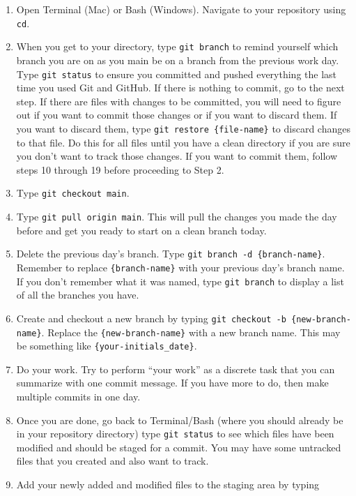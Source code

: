 \documentclass[
]{book}
\providecommand{\tightlist}{%
  \setlength{\itemsep}{0pt}\setlength{\parskip}{0pt}}
\begin{document}
\begin{enumerate}
\def\labelenumi{\arabic{enumi}.}
\tightlist
\item
  Open Terminal (Mac) or Bash (Windows). Navigate to your repository using \texttt{cd}.
\item
  When you get to your directory, type \texttt{git\ branch} to remind yourself
  which branch you are on as you main be on a branch from the previous work day.
  Type \texttt{git\ status} to ensure you committed and pushed everything the last time
  you used Git and GitHub. If there is nothing to commit, go to the next step.
  If there are files with changes to be committed, you will need to figure out if
  you want to commit those changes or if you want to discard them. If you want to
  discard them, type \texttt{git\ restore\ \{file-name\}} to discard changes to that file. Do
  this for all files until you have a clean directory if you are sure you don't
  want to track those changes. If you want to commit them, follow steps 10 through 19
  before proceeding to Step 2.
\item
  Type \texttt{git\ checkout\ main}.
\item
  Type \texttt{git\ pull\ origin\ main}. This will pull the changes you made
  the day before and get you ready to start on a clean branch today.
\item
  Delete the previous day's branch. Type \texttt{git\ branch\ -d\ \{branch-name\}}.
  Remember to replace \texttt{\{branch-name\}} with your previous day's branch
  name. If you don't remember what it was named, type \texttt{git\ branch} to display a
  list of all the branches you have.
\item
  Create and checkout a new branch by typing \texttt{git\ checkout\ -b\ \{new-branch-name\}}.
  Replace the \texttt{\{new-branch-name\}} with a new branch name. This may be something
  like \texttt{\{your-initials\_date\}}.
\item
  Do your work. Try to perform ``your work'' as a discrete task that you can summarize
  with one commit message. If you have more to do, then make multiple commits in
  one day.
\item
  Once you are done, go back to Terminal/Bash (where you should already be in
  your repository directory) type \texttt{git\ status} to see which files have been modified
  and should be staged for a commit. You may have some untracked files that you
  created and also want to track.
\item
  Add your newly added and modified files to the staging area by typing

\end{enumerate}
\end{document}
